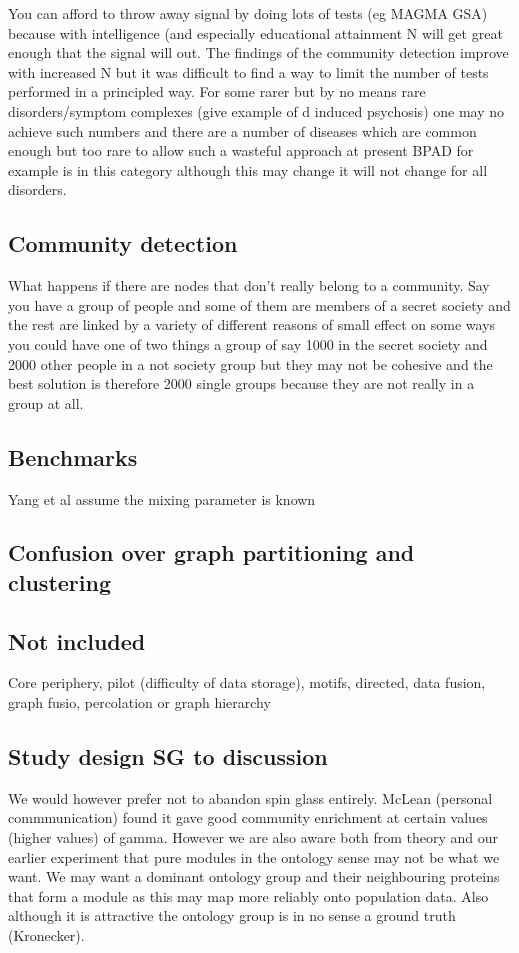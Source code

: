  You can afford to throw away signal by doing lots of tests (eg MAGMA GSA) because with intelligence (and especially educational attainment N will get great enough that the signal will out. The findings of the community detection improve with increased N but it was difficult to find a way to limit the number of tests performed in a principled way. For some rarer but by no means rare disorders/symptom complexes (give example of d induced psychosis) one may no achieve such numbers and there are a number of diseases which are common enough but too rare to allow such a wasteful approach at present BPAD for example is in this category although this may change it will not change for all disorders.
 
 
 \subsection{Community detection}
 What happens if there are nodes that don't really belong to a community. Say you have a group of people and some of them are members of a secret society and the rest are linked by a variety of different reasons of small effect on some ways you could have one of two things a group of say 1000 in the secret society and 2000 other people in a not society group but they may not be cohesive and the best solution is therefore 2000 single groups because they are not really in a group at all. 
 
 
 \subsection{Benchmarks}
 
 Yang et al \cite{yang2016comparative} assume the mixing parameter is known 
 
 
 \subsection{Confusion over graph partitioning and clustering}
 
 \subsection{Not included}
 Core periphery, pilot (difficulty of data storage), motifs, directed, data fusion, graph fusio, percolation or graph hierarchy
 
 
 \subsection{Study design SG to discussion}
We would however prefer not to abandon spin glass entirely. McLean (personal commmunication) found it gave good community enrichment at certain values (higher values) of gamma. However we are also aware both from theory and our earlier experiment that pure modules in the ontology sense may not be what we want. We may want a dominant ontology group and their neighbouring proteins that form a module as this may map more reliably onto population data. Also although it is attractive the ontology group is in no sense a ground truth  (Kronecker).



